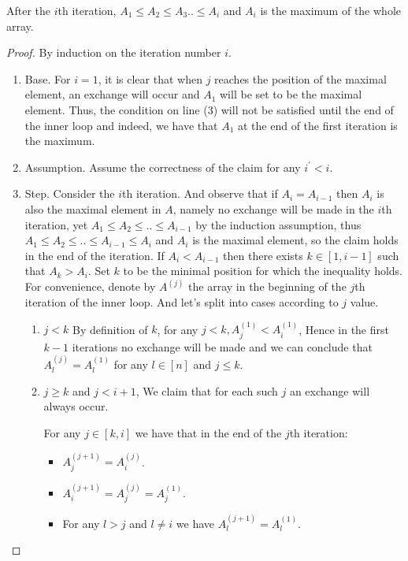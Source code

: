 \begin{claim}
  \label{claim:first}
  After the $i$th iteration, $A_{1} \le A_{2} \le A_{3} .. \le A_{i}$ and $A_{i}$ is the maximum of the whole array. 
\end{claim}
\begin{proof}
  By induction on the iteration number $i$. 
  \begin{enumerate}
    \item Base. For $i=1$, it is clear that when $j$ reaches the position of the maximal element, an exchange will occur and $A_{1}$ will be set to be the maximal element. Thus, the condition on line (3) will not be satisfied until the end of the inner loop and indeed, we have that $A_{1}$ at the end of the first iteration is the maximum.
    \item Assumption. Assume the correctness of the claim for any $i^{\prime} < i$. 
    \item Step. Consider the $i$th iteration. And observe that if $A_{i} = A_{i-1}$ then $A_{i}$ is also the maximal element in $A$, namely no exchange will be made in the $i$th iteration, yet $A_{1} \le A_{2} \le .. \le A_{i-1}$ by the induction assumption, thus  $A_{1} \le A_{2} \le .. \le A_{i-1} \le A_{i}$ and $A_{i}$ is the maximal element, so the claim holds in the end of the iteration. 
      If $A_{i} < A_{i-1}$ then there exists $k \in [1,i-1]$ such that $A_{k} > A_{i}$. Set $k$ to be the minimal position for which the inequality holds. For convenience, denote by $A^{(j)}$ the array in the beginning of the $j$th iteration of the inner loop. And let's split into cases according to $j$ value. 
      \begin{enumerate}
        \item $j < k$ By definition of $k$, for any $j < k, A^{(1)}_{j} < A^{(1)}_{i}$, Hence in the first $k-1$ iterations no exchange will be made and we can conclude that $A^{(j)}_{l} = A^{(1)}_{l}$ for any $l \in [n]$ and $j \le k$. 
        \item $j \ge k$ and $j<i+1$, We claim that for each such $j$ an exchange will always occur. 
          \begin{claim}
            \label{claim:second}
            For any $j \in [k,i]$ we have that in the end of the $j$th iteration:  
            \begin{itemize}
              \item $A^{(j+1)}_{j} = A^{(j)}_{i}$.
              \item $A^{(j+1)}_{i} = A^{(j)}_{j} = A^{(1)}_{j}$.
              \item For any $l > j$ and $l \neq i$ we have $A^{(j+1)}_{l} = A^{(1)}_{l}$.
            \end{itemize}
          \end{claim}


\end{enumerate}
\end{enumerate}
\end{proof}
